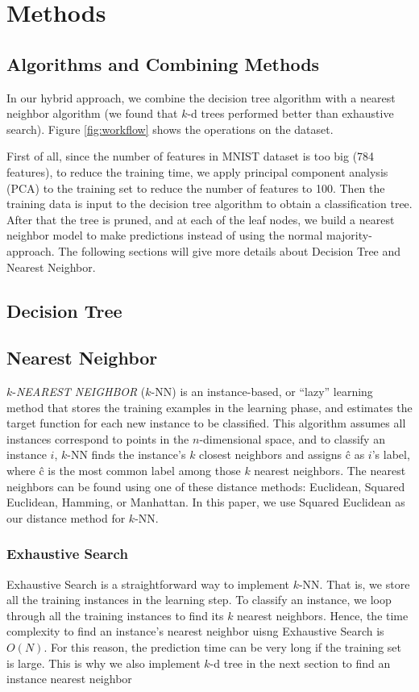 \section{Methods}
\subsection{Algorithms and Combining Methods}
In our hybrid approach, we combine the decision tree algorithm with a nearest neighbor algorithm (we found that $k$-d trees performed better than exhaustive search). Figure \ref{fig:workflow} shows the operations on the dataset.

First of all, since the number of features in MNIST dataset is too big (784 features), to reduce the training time, we apply principal component analysis (PCA) to the training set to reduce the number of features to 100. Then the training data is input to the decision tree algorithm to obtain a classification tree. After that the tree is pruned, and at each of the leaf nodes, we build a nearest neighbor model to make predictions instead of using the normal majority-approach. The following sections will give more details about Decision Tree and Nearest Neighbor.

\subsection{Decision Tree}

\subsection{Nearest Neighbor}
$k$-\textit{NEAREST NEIGHBOR} ($k$-NN) is an instance-based, or ``lazy'' learning method that stores the training examples in the learning phase, and estimates the target function for each new instance to be classified. This algorithm assumes all instances correspond to points in the $n$-dimensional space, and to classify an instance $i$, $k$-NN finds the instance's $k$ closest neighbors and assigns \^{c} as $i$'s label, where \^{c} is the most common label among those $k$ nearest neighbors. The nearest neighbors can be found using one of these distance methods: Euclidean, Squared Euclidean, Hamming, or Manhattan. In this paper, we use Squared Euclidean as our distance method for $k$-NN.
\subsubsection{Exhaustive Search}
Exhaustive Search is a straightforward way to implement $k$-NN. That is, we store all the training instances in the learning step. To classify an instance, we loop through all the training instances to find its $k$ nearest neighbors. Hence, the time complexity to find an instance's nearest neighbor uisng Exhaustive Search is $O(N)$. For this reason, the prediction time can be very long if the training set is large. This is why we also implement $k$-d tree in the next section to find an instance nearest neighbor

